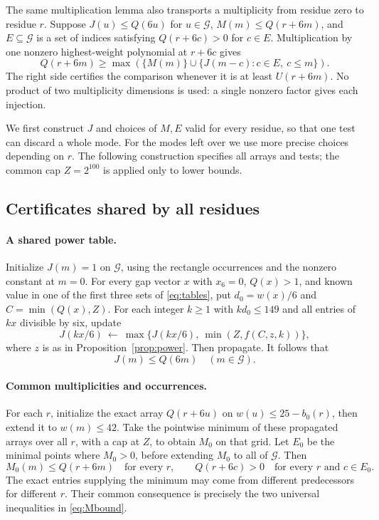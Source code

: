 The same multiplication lemma also transports a multiplicity from
residue zero to residue \(r\). Suppose \(J(u)\le Q(6u)\) for
\(u\in\mathcal G\), \(M(m)\le Q(r+6m)\), and \(E\subseteq\mathcal G\)
is a set of indices satisfying
\(Q(r+6c)>0\) for \(c\in E\). Multiplication by one nonzero
highest-weight polynomial at \(r+6c\) gives
\begin{equation}\label{eq:transport}
 Q(r+6m)\ge
 \max\left(\{M(m)\}\cup
      \{J(m-c):c\in E,\ c\le m\}\right).
\end{equation}
The right side certifies the comparison whenever it is at least
\(U(r+6m)\). No product of two multiplicity dimensions is used: a
single nonzero factor gives each injection.

We first construct \(J\) and choices of \(M,E\) valid for every residue,
so that one test can discard a whole mode. For the modes left over we
use more precise choices depending on \(r\). The following construction
specifies all arrays and tests; the common cap \(Z=2^{100}\) is applied
only to lower bounds.

\subsection{Certificates shared by all residues}

\paragraph{A shared power table.}
Initialize \(J(m)=1\) on \(\mathcal G\), using the rectangle occurrences
and the nonzero constant at \(m=0\). For every gap vector \(x\) with
\(x_6=0\), \(Q(x)>1\), and known value in one of the first three sets
of \eqref{eq:tables}, put \(d_0=w(x)/6\) and \(C=\min(Q(x),Z)\).
For each integer \(k\ge1\) with \(kd_0\le149\) and all entries of \(kx\)
divisible by six, update
\[
             J(kx/6)\ \gets\
                 \max\{J(kx/6),\ \min(Z,f(C,z,k))\},
\]
where \(z\) is as in Proposition~\ref{prop:power}. Then propagate.
It follows that
\begin{equation}\label{eq:Jbound}
                         J(m)\le Q(6m)\quad(m\in\mathcal G).
\end{equation}

\paragraph{Common multiplicities and occurrences.}
For each \(r\), initialize the exact array \(Q(r+6u)\) on
\(w(u)\le25-b_0(r)\), then extend it to \(w(m)\le42\).
Take the pointwise minimum of these propagated arrays over all \(r\),
with a cap at \(Z\), to obtain \(M_0\) on that grid.
Let \(E_0\) be the minimal points where \(M_0>0\), before extending
\(M_0\) to all of \(\mathcal G\). Then
\begin{equation}\label{eq:Mbound}
 M_0(m)\le Q(r+6m)\quad\text{for every }r,\qquad
 Q(r+6c)>0\quad\text{for every }r\text{ and }c\in E_0.
\end{equation}
The exact entries supplying the minimum may come from different
predecessors for different \(r\). Their common consequence is precisely
the two universal inequalities in \eqref{eq:Mbound}.


